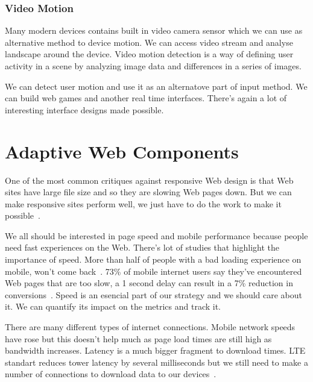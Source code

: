 \documentclass{iitsrc}
\begin{document}

\subsubsection*{Video Motion} %
\label{sub:video_motion}

Many modern devices contains built in video camera sensor which we can use as alternative method to device motion. We can access video stream and analyse landscape around the device. Video motion detection is a way of defining user activity in a scene by analyzing image data and differences in a series of images.

We can detect user motion and use it as an alternatove part of input method. We can build web games and another real time interfaces. There's again a lot of interesting interface designs made possible.


\section{Adaptive Web Components} %
\label{sec:adaptive_web_components}

One of the most common critiques against responsive Web design is that Web sites have large file size and so they are slowing Web pages down. But we can make responsive sites perform well, we just have to do the work to make it possible~\cite{20mb}.

We all should be interested in page speed and mobile performance because people need fast experiences on the Web. There's lot of studies that highlight the importance of speed. More than half of people with a bad loading experience on mobile, won't come back~\cite{performancebrowsernetworking}. 73\% of mobile internet users say they've encountered Web pages that are too slow, a 1 second delay can result in a 7\% reduction in conversions~\cite{pagespeed}. Speed is an esencial part of our strategy and we should care about it. We can quantify its impact on the metrics and track it.

There are many different types of internet connections. Mobile network speeds have rose but this doesn't help much as page load times are still high as bandwidth increases. Latency is a much bigger fragment to download times. LTE standart reduces tower latency by several milliseconds but we still need to make a number of connections to download data to our devices~\cite{performancebrowsernetworking}.
\end{document}
